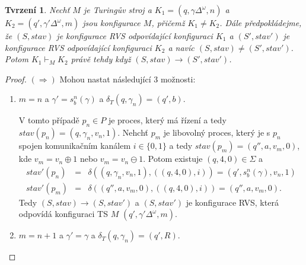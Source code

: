 \documentclass[a4paper,12pt]{article}
\newcounter{counten}
\newtheorem{theorem}{Tvrzení}[counten]
\begin{document}
\begin{enumerate}[label=\textbf{\arabic*}.]
 \begin{theorem}
 Nechť $M$ je Turingův stroj a $K_1 = (q, \gamma\Delta^{\omega}, n)$ a $K_2 = (q', \gamma'\Delta^{\omega}, m)$ jsou konfigurace $M$, přičemž $K_1\neq K_2$. Dále předpokládejme, že
 $(S, stav)$ je konfigurace RVS odpovídající konfiguraci $K_1$ a $(S', stav')$ je konfigurace RVS 
 odpovídající konfiguraci $K_2$ a navíc $(S, stav) \neq (S', stav')$. Potom $K_1 \vdash_M K_2$
 právě tehdy když $(S, stav) \rightarrow (S', stav')$.
 \end{theorem}
 \begin{proof}
 $(\Rightarrow)$ Mohou nastat následující 3 možnosti:
 \begin{enumerate}
  \item $m = n$ a $\gamma' = s_b^n(\gamma)$ a $\delta_T(q, \gamma_n) = (q', b)$.
  
   V tomto případě $p_n\in P$ je proces, který má řízení a tedy $stav(p_n) = (q, \gamma_n, v_n, 1)$.
   Nehchť $p_m$ je libovolný proces, který je s $p_n$ spojen komunikačním kanálem $i\in\{0,1\}$ a tedy $stav(p_m) = (q'', a, v_m, 0)$,
   kde $v_m = v_n \oplus 1$ nebo $v_m = v_n \ominus 1$. Potom existuje $(q, 4, 0) \in\Sigma$ a 
   \begin{eqnarray*}
      stav'(p_n) &=& \delta((q, \gamma_n, v_n, 1), ((q, 4, 0),i)) = (q',s_b^n(\gamma), v_n, 1)\\
      stav'(p_m) &=& \delta((q'', a, v_m, 0),((q, 4, 0),i)) = (q'', a, v_m, 0).
   \end{eqnarray*}
   Tedy $(S, stav) \rightarrow (S, stav')$ a $(S, stav')$ je konfigurace RVS, která odpovídá konfiguraci TS $M$ $(q', \gamma'\Delta^{\omega}, m)$.
   
  \item $m = n + 1$ a $\gamma' = \gamma$ a $\delta_T(q, \gamma_n) = (q', R)$.
  

\end{enumerate}
\end{proof}
\end{enumerate}
\end{document}
